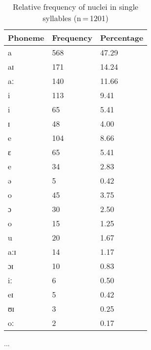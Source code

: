 \begin{table}[hp]\centering
\caption[Relative frequency of nuclei in single syllables]{Relative frequency of nuclei in single syllables (n\,=\,1201)}
\begin{tabu} to 0.5\textwidth{X X[c] X[c]}
\tableheaderfont\toprule
Phoneme
	& Frequency
	& Percentage
	\\
	
\toprule

a	&	568	&	47.29\pct\\
aɪ	&	171	&	14.24\pct\\
aː	&	140	&	11.66\pct\\

\midrule

i	&	113	&	9.41\pct\\
\rowfont{\scriptsize\itshape}
\raggedleft
i	&	65	&	5.41\pct\\
\rowfont{\scriptsize\itshape}
\raggedleft
ɪ	&	48	&	4.00\pct\\

\midrule

e	&	104	&	8.66\pct\\
\rowfont{\scriptsize\itshape}
\raggedleft
ɛ	&	65	&	5.41\pct\\
\rowfont{\scriptsize\itshape}
\raggedleft
e	&	34	&	2.83\pct\\
\rowfont{\scriptsize\itshape}
\raggedleft
ə	&	5	&	0.42\pct\\

\midrule

o	&	45	&	3.75\pct\\
\rowfont{\scriptsize\itshape}
\raggedleft
ɔ	&	30	&	2.50\pct\\
\rowfont{\scriptsize\itshape}
\raggedleft
o	&	15	&	1.25\pct\\

\midrule

u	&	20	&	1.67\pct\\
aːɪ	&	14	&	1.17\pct\\
ɔɪ	&	10	&	0.83\pct\\
iː	&	6	&	0.50\pct\\
eɪ	&	5	&	0.42\pct\\
ʊɪ	&	3	&	0.25\pct\\
oː	&	2	&	0.17\pct\\

\bottomrule
\end{tabu}
\label{tab:singnuc}
\end{table}

...

